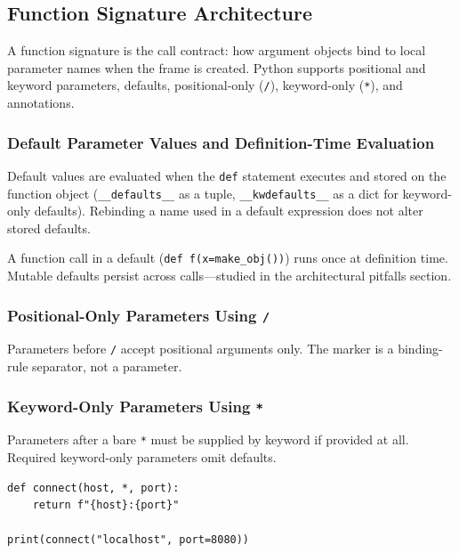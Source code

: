 \subsection{Function Signature Architecture}

A function signature is the call contract: how argument objects bind to local parameter names when the frame is created. Python supports positional and keyword parameters, defaults, positional-only (\texttt{/}), keyword-only (\texttt{*}), and annotations.

\subsubsection{Default Parameter Values and Definition-Time Evaluation}

Default values are evaluated when the \texttt{def} statement executes and stored on the function object (\texttt{\_\_defaults\_\_} as a tuple, \texttt{\_\_kwdefaults\_\_} as a dict for keyword-only defaults). Rebinding a name used in a default expression does not alter stored defaults.



A function call in a default (\texttt{def f(x=make\_obj())}) runs once at definition time. Mutable defaults persist across calls---studied in the architectural pitfalls section.

\subsubsection{Positional-Only Parameters Using \texttt{/}}

Parameters before \texttt{/} accept positional arguments only. The marker is a binding-rule separator, not a parameter.



\subsubsection{Keyword-Only Parameters Using \texttt{*}}

Parameters after a bare \texttt{*} must be supplied by keyword if provided at all. Required keyword-only parameters omit defaults.

\begin{verbatim}
def connect(host, *, port):
    return f"{host}:{port}"

print(connect("localhost", port=8080))
\end{verbatim}

